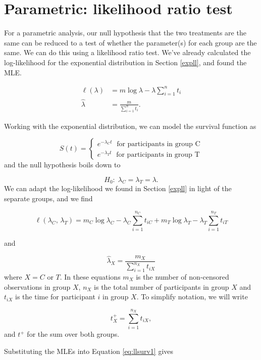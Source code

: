 \documentclass[
  openany]{book}
\theoremstyle{definition}
\theoremstyle{definition}
\theoremstyle{definition}
\theoremstyle{definition}
\theoremstyle{remark}
\begin{document}
\section{Parametric: likelihood ratio test}\label{survlrtest}

For a parametric analysis, our null hypothesis that the two treatments are the same can be reduced to a test of whether the parameter(s) for each group are the same. We can do this using a likelihood ratio test. We've already calculated the log-likelihood for the exponential distribution in Section \ref{expll}, and found the MLE.

\begin{align*}
\ell\left(\lambda\right) & = m\log\lambda - \lambda\sum\limits_{i=1}^n t_i\\
\hat{\lambda} & = \frac{m}{\sum\limits_{i=1}^n t_i}.
\end{align*}

Working with the exponential distribution, we can model the survival function as

\[S\left(t\right) = 
\begin{cases}
e^{-\lambda_Ct}\; \text{ for participants in group C}\\
e^{-\lambda_Tt}\; \text{ for participants in group T}
\end{cases}
\]
and the null hypothesis boils down to

\[H_0: \; \lambda_C = \lambda_T = \lambda. \]
We can adapt the log-likelihood we found in Section \ref{expll} in light of the separate groups, and we find

\begin{equation}
\ell\left(\lambda_C,\,\lambda_T\right) = m_C\log\lambda_C - \lambda_C\sum\limits_{i=1}^{n_C}t_{iC} + m_T\log\lambda_T - \lambda_T\sum\limits_{i=1}^{n_T}t_{iT}  
\label{eq:llsurv1}
\end{equation}

and

\[\hat{\lambda}_X = \frac{m_X}{\sum\limits_{i=1}^{n_X}t_{iX}}\]
where \(X=C\) or \(T\). In these equations \(m_X\) is the number of non-censored observations in group \(X\), \(n_X\) is the total number of participants in group \(X\) and \(t_{iX}\) is the time for participant \(i\) in group \(X\). To simplify notation, we will write

\[t^+_X = \sum\limits_{i=1}^{n_X}t_{iX},\]
and \(t^+\) for the sum over both groups.

Substituting the MLEs into Equation \eqref{eq:llsurv1} gives
\end{document}
